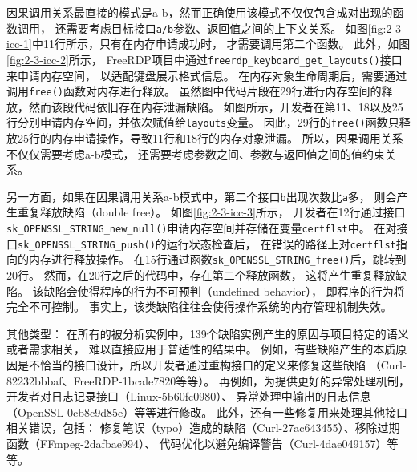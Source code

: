 

因果调用关系最直接的模式是a-b，然而正确使用该模式不仅仅包含成对出现的函数调用，
还需要考虑目标接口\texttt{a/b}参数、返回值之间的上下文关系。
如图\ref{fig:2-3-icc-1}中11行所示，只有在内存申请成功时，
才需要调用第二个函数。
此外，如图\ref{fig:2-3-icc-2}所示，
FreeRDP项目中通过\texttt{freerdp\_keyboard\_get\_layouts()}接口来申请内存空间，
以适配键盘展示格式信息。
在内存对象生命周期后，需要通过调用\texttt{free()}函数对内存进行释放。
虽然图中代码片段在29行进行内存空间的释放，然而该段代码依旧存在内存泄漏缺陷。
如图所示，开发者在第11、18以及25行分别申请内存空间，并依次赋值给\texttt{layouts}变量。
因此，29行的\texttt{free()}函数只释放25行的内存申请操作，导致11行和18行的内存对象泄漏。
所以，因果调用关系不仅仅需要考虑a-b模式，
还需要考虑参数之间、参数与返回值之间的值约束关系。

另一方面，如果在因果调用关系a-b模式中，第二个接口\texttt{b}出现次数比\texttt{a}多，
则会产生重复释放缺陷（double free）。
如图\ref{fig:2-3-icc-3}所示，
开发者在12行通过接口\texttt{sk\_OPENSSL\_STRING\_new\_null()}申请内存空间并存储在变量\texttt{certflst}中。
在对接口\texttt{sk\_OPENSSL\_STRING\_push()}的运行状态检查后，
在错误的路径上对\texttt{certflst}指向的内存进行释放操作。
在15行通过函数\texttt{sk\_OPENSSL\_STRING\_free()}后，跳转到20行。
然而，在20行之后的代码中，存在第二个释放函数，
这将产生重复释放缺陷。
该缺陷会使得程序的行为不可预判（undefined behavior），
即程序的行为将完全不可控制。
事实上，该类缺陷往往会使得操作系统的内存管理机制失效。


\vspace*{10pt}
\begin{center}
	\noindent{}
\end{center}

{其他类型}：
在所有的被分析实例中，139个缺陷实例产生的原因与项目特定的语义或者需求相关，
难以直接应用于普适性的结果中。
例如，有些缺陷产生的本质原因是不恰当的接口设计，所以开发者通过重构接口的定义来修复这些缺陷
（Curl-82232bbbaf、FreeRDP-1bcale7820等等）。
再例如，为提供更好的异常处理机制，开发者对日志记录接口（Linux-5b60fc0980）、
异常处理中输出的日志信息（OpenSSL-0cb8c9d85e）等等进行修改。
此外，还有一些修复用来处理其他接口相关错误，包括：
修复笔误（typo）造成的缺陷（Curl-27ac643455）、移除过期函数（FFmpeg-2dafbae994）、
代码优化以避免编译警告（Curl-4dae049157）等等。

